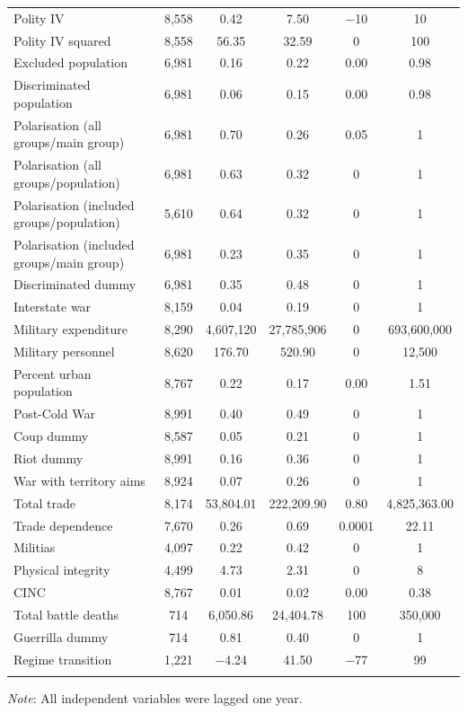 \begin{table}[!htbp]
\begin{tabular}{@{\extracolsep{5pt}}lccccc}
Polity IV & 8,558 & 0.42 & 7.50 & $-$10 & 10 \\ 
Polity IV squared & 8,558 & 56.35 & 32.59 & 0 & 100 \\ 
Excluded population & 6,981 & 0.16 & 0.22 & 0.00 & 0.98 \\ 
Discriminated population & 6,981 & 0.06 & 0.15 & 0.00 & 0.98 \\ 
Polarisation (all groups/main group) & 6,981 & 0.70 & 0.26 & 0.05 & 1 \\ 
Polarisation (all groups/population) & 6,981 & 0.63 & 0.32 & 0 & 1 \\ 
Polarisation (included groups/population) & 5,610 & 0.64 & 0.32 & 0 & 1 \\ 
Polarisation (included groups/main group) & 6,981 & 0.23 & 0.35 & 0 & 1 \\ 
Discriminated dummy & 6,981 & 0.35 & 0.48 & 0 & 1 \\ 
Interstate war & 8,159 & 0.04 & 0.19 & 0 & 1 \\ 
Military expenditure & 8,290 & 4,607,120 & 27,785,906 & 0 & 693,600,000 \\ 
Military personnel & 8,620 & 176.70 & 520.90 & 0 & 12,500 \\ 
Percent urban population & 8,767 & 0.22 & 0.17 & 0.00 & 1.51 \\ 
Post-Cold War & 8,991 & 0.40 & 0.49 & 0 & 1 \\ 
Coup dummy & 8,587 & 0.05 & 0.21 & 0 & 1 \\ 
Riot dummy & 8,991 & 0.16 & 0.36 & 0 & 1 \\ 
War with territory aims & 8,924 & 0.07 & 0.26 & 0 & 1 \\ 
Total trade & 8,174 & 53,804.01 & 222,209.90 & 0.80 & 4,825,363.00 \\ 
Trade dependence & 7,670 & 0.26 & 0.69 & 0.0001 & 22.11 \\ 
Militias & 4,097 & 0.22 & 0.42 & 0 & 1 \\ 
Physical integrity & 4,499 & 4.73 & 2.31 & 0 & 8 \\ 
CINC & 8,767 & 0.01 & 0.02 & 0.00 & 0.38 \\ 
Total battle deaths & 714 & 6,050.86 & 24,404.78 & 100 & 350,000 \\  
Guerrilla dummy & 714 & 0.81 & 0.40 & 0 & 1 \\ 
Regime transition & 1,221 & $-$4.24 & 41.50 & $-$77 & 99 \\ 
\hline \\[-1.8ex] 
\end{tabular} 
\raggedright{\newline \textit{Note}: All independent variables were lagged one year.}
\end{table} 
\normalsize

